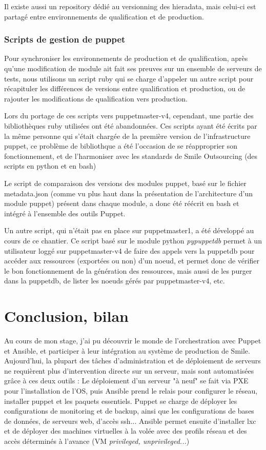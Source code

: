 \documentclass[14 pt,a4paper]{extreport}
\begin{document}
Il existe aussi un repository dédié au versionning des hieradata, mais celui-ci est partagé entre environnements de qualification et de production.

\subsection{Scripts de gestion de puppet}

Pour synchroniser les environnements de production et de qualification, après qu'une modification de module ait fait ses preuves sur un ensemble de serveurs de tests, nous utilisons un script ruby qui se charge d'appeler un autre script pour récapituler les différences de versions entre qualification et production, ou de rajouter les modifications de qualification vers production.

Lors du portage de ces scripts vers puppetmaster-v4, cependant, une partie des bibliothèques ruby utilisées ont été abandonnées. Ces scripts ayant été écrits par la même personne qui s'était chargée de la première version de l'infrastructure puppet, ce problème de bibliothque a été l'occasion de se réapproprier son fonctionnement, et de l'harmoniser avec les standards de Smile Outsourcing (des scripts en python et en bash)

Le script de comparaison des versions des modules puppet, basé sur le fichier metadata.json (comme vu plus haut dans la présentation de l'architecture d'un module puppet) présent dans chaque module, a donc été réécrit en bash et intégré à l'ensemble des outils Puppet.

Un autre script, qui n'était pas en place sur puppetmaster1, a été développé au cours de ce chantier. Ce script basé sur le module python \emph{pypuppetdb} permet à un utilisateur loggé sur puppetmaster-v4 de faire des appels vers la puppetdb pour accéder aux ressources (exportées ou non) d'un noeud, et permet donc de vérifier le bon fonctionnement de la génération des ressources, mais aussi de les purger dans la puppetdb, de lister les noeuds gérés par puppetmaster-v4, etc.

\chapter{Conclusion, bilan}

Au cours de mon stage, j'ai pu découvrir le monde de l'orchestration avec Puppet et Ansible, et participer à leur intégration au système de production de Smile. Aujourd'hui, la plupart des tâches d'administration et de déploiement de serveurs ne requièrent plus d'intervention directe sur un serveur, mais sont automatisées grâce à ces deux outils : Le déploiement d'un serveur "à neuf" se fait via PXE pour l'installation de l'OS, puis Ansible prend le relais pour configurer le réseau, installer puppet et les paquets essentiels. Puppet se charge de déployer les configurations de monitoring et de backup, ainsi que les configurations de bases de données, de serveurs web, d'accès ssh... Ansible permet ensuite d'installer lxc et de déployer des machines virtuelles à la volée avec des profils réseau et des accès déterminés à l'avance (VM \emph{privileged, unprivileged...})
\end{document}

